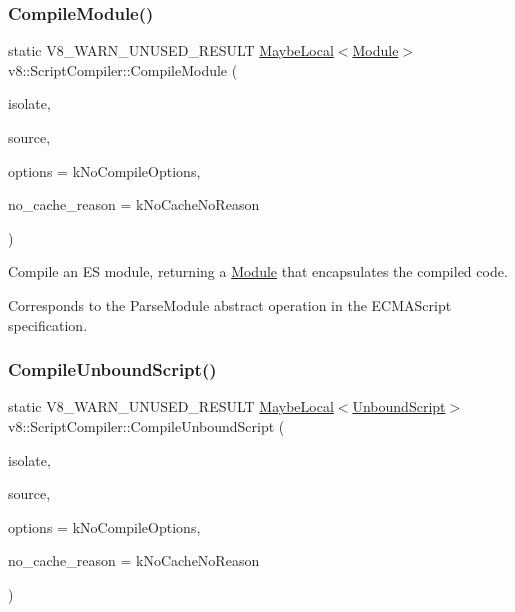 \subsubsection{\texorpdfstring{Compile\+Module()}{CompileModule()}}
{\footnotesize\ttfamily static V8\+\_\+\+W\+A\+R\+N\+\_\+\+U\+N\+U\+S\+E\+D\+\_\+\+R\+E\+S\+U\+LT \mbox{\hyperlink{classv8_1_1MaybeLocal}{Maybe\+Local}}$<$\mbox{\hyperlink{classv8_1_1Module}{Module}}$>$ v8\+::\+Script\+Compiler\+::\+Compile\+Module (\begin{DoxyParamCaption}\item[{\mbox{\hyperlink{classv8_1_1Isolate}{Isolate}} $\ast$}]{isolate,  }\item[{\mbox{\hyperlink{classv8_1_1ScriptCompiler_1_1Source}{Source}} $\ast$}]{source,  }\item[{Compile\+Options}]{options = {\ttfamily kNoCompileOptions},  }\item[{\mbox{\hyperlink{classv8_1_1ScriptCompiler_a7f13fa15484cfc500ae51927756e0d60}{No\+Cache\+Reason}}}]{no\+\_\+cache\+\_\+reason = {\ttfamily kNoCacheNoReason} }\end{DoxyParamCaption})\hspace{0.3cm}{\ttfamily [static]}}

Compile an ES module, returning a \mbox{\hyperlink{classv8_1_1Module}{Module}} that encapsulates the compiled code.

Corresponds to the Parse\+Module abstract operation in the E\+C\+M\+A\+Script specification. \mbox{\label{classv8_1_1ScriptCompiler_a4054a9857df7f2e6a8747f23108776e7}} 
\subsubsection{\texorpdfstring{Compile\+Unbound\+Script()}{CompileUnboundScript()}}
{\footnotesize\ttfamily static V8\+\_\+\+W\+A\+R\+N\+\_\+\+U\+N\+U\+S\+E\+D\+\_\+\+R\+E\+S\+U\+LT \mbox{\hyperlink{classv8_1_1MaybeLocal}{Maybe\+Local}}$<$\mbox{\hyperlink{classv8_1_1UnboundScript}{Unbound\+Script}}$>$ v8\+::\+Script\+Compiler\+::\+Compile\+Unbound\+Script (\begin{DoxyParamCaption}\item[{\mbox{\hyperlink{classv8_1_1Isolate}{Isolate}} $\ast$}]{isolate,  }\item[{\mbox{\hyperlink{classv8_1_1ScriptCompiler_1_1Source}{Source}} $\ast$}]{source,  }\item[{Compile\+Options}]{options = {\ttfamily kNoCompileOptions},  }\item[{\mbox{\hyperlink{classv8_1_1ScriptCompiler_a7f13fa15484cfc500ae51927756e0d60}{No\+Cache\+Reason}}}]{no\+\_\+cache\+\_\+reason = {\ttfamily kNoCacheNoReason} }\end{DoxyParamCaption})\hspace{0.3cm}{\ttfamily [static]}}

